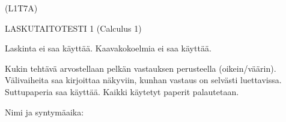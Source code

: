 \documentclass[finnish, a4paper, 12pt]{article}
\begin{document}
	
	
	\begin{flushright}
		(L1T7A)	%
	\end{flushright}
	
	\begin{center}
		{\large
			LASKUTAITOTESTI 1 (Calculus 1)}
	\end{center}
	
	Laskinta ei saa käyttää. Kaavakokoelmia ei saa käyttää.
	
	Kukin tehtävä arvostellaan pelkän vastauksen perusteella (oikein/väärin).
	Välivaiheita saa kirjoittaa näkyviin, kunhan vastaus on selvästi luettavissa.
	Suttupaperia saa käyttää. Kaikki käytetyt paperit palautetaan.
	
\vspace{12pt}
Nimi ja syntymäaika: \phantom{m} \hrulefill
\vspace{8pt}
	
\end{document}
